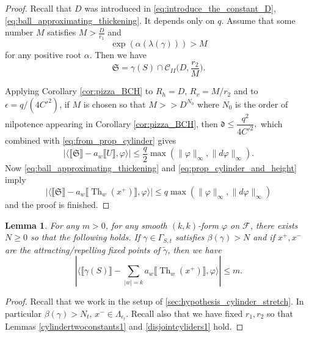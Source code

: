 \documentclass[12pt]{amsbook}%
\newtheorem{lem}[thm]{Lemma}
\theoremstyle{definition}
\theoremstyle{remark}
\numberwithin{section}{chapter}
\numberwithin{subsection}{section}
\numberwithin{figure}{chapter}
\DeclareMathOperator{\Th}{Th}
\def\cF{{\mathscr{F}}}
\def\fd{{\mathfrak{d}}}
\def\fS{{\mathfrak{S}}}
\def\tga{{\tilde{\gamma}}}
\def\Cylii{{\mathcal{C}_{II}}}
\def\ga{\gamma}
\def\la{\lambda}
\begin{document}
{{\begin{proof}
Recall that $D$ was introduced in \eqref{eq:introduce_the_constant_D}, \eqref{eq:ball_approximating_thickening}. It depends only on $q$. Assume that some number $M$ satisfies $M>\frac{D}{r_1}$ and 
\[\exp(\alpha(\la(\gamma)))>M\]
for any positive root $\alpha$. Then we have 
\[
\fS=\gamma(S)\cap\Cylii\big(D,\frac{r_2}{M}\big).
\]

Applying Corollary \ref{cor:pizza_BCH} to $R_h =D$, $R_v= M/r_2$ and to $\epsilon = q/(4C'^2)$, if $M$ is chosen so that  $M>>D^{N_0}$ where $N_0$ is the order of nilpotence appearing in Corollary \ref{cor:pizza_BCH},  then 
$
\fd\leqslant 
\dfrac{q^2}{4{C'}^2},
$
which combined with \eqref{eq:from_prop_cylinder} gives 
\begin{equation}\label{eq:prop_cylinder_and_height}
\left\lvert\langle \llbracket \fS \rrbracket - a_w\llbracket U \rrbracket, \varphi \rangle\right\rvert \leqslant \dfrac{q}{2} \max(  \lVert \varphi \rVert_{\infty}, \lVert d\varphi\rVert_\infty).
\end{equation}
Now \eqref{eq:ball_approximating_thickening} and \eqref{eq:prop_cylinder_and_height} imply
\begin{equation*}
\big\lvert\langle \llbracket \fS\rrbracket - a_w\llbracket \Th_{w}(x^+)\rrbracket , \varphi \rangle \big\rvert \leqslant q\max(  \lVert \varphi \rVert_{\infty}, \lVert d\varphi\rVert_\infty)
\end{equation*}
and the proof is finished.
\end{proof}






\begin{lem}\label{lem:geometric_redressing}
For any $m>0$, for any smooth $(k,k)$-form $\varphi$ on $\cF$, there exists $N \geq 0$ so that the following holds. If $\gamma \in \Gamma_{S,t}$ satisfies $\beta(\gamma)>N$ and if $x^+,x^-$ are the attracting/repelling fixed points of $\tga$, then we have
\[
|\langle \llbracket\ga(S)\rrbracket  - \sum_{\vert w\vert=k}a_w\llbracket \Th_{w}(x^+)\rrbracket , \varphi \rangle | \leqslant m.
\]
\end{lem}

\begin{proof}
Recall that we work in the setup of \ref{sec:hypothesis_cylinder_stretch}. In particular $\beta(\gamma) >N_t$, $x^-\in \Lambda_{\epsilon_t}$. Recall also that we have fixed $r_1,r_2$ so that Lemmas \ref{cylindertwoconstants1} and \ref{disjointcyliders1} hold.     


\end{proof}}}
\end{document}
